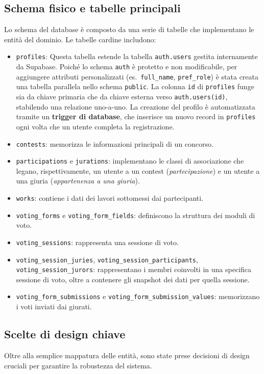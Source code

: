\subsection{Schema fisico e tabelle principali}\label{subsec:schema-fisico-e-tabelle-principali}
Lo schema del database è composto da una serie di tabelle che implementano le entità del dominio.
Le tabelle cardine includono:
\begin{itemize}
    \item \texttt{profiles}: Questa tabella estende la tabella \texttt{auth.users} gestita internamente da Supabase.
    Poiché lo schema \texttt{auth} è protetto e non modificabile, per aggiungere attributi personalizzati (es.\ \texttt{full\_name}, \texttt{pref\_role}) è stata creata una tabella parallela nello schema \texttt{public}.
    La colonna \texttt{id} di \texttt{profiles} funge sia da chiave primaria che da chiave esterna verso \texttt{auth.users(id)}, stabilendo una relazione uno-a-uno.
    La creazione del profilo è automatizzata tramite un \textbf{trigger di database}, che inserisce un nuovo record in \texttt{profiles} ogni volta che un utente completa la registrazione.
    \item \texttt{contests}: memorizza le informazioni principali di un concorso.
    \item \texttt{participations} e \texttt{jurations}: implementano le classi di associazione che legano, rispettivamente, un utente a un contest (\emph{partecipazione}) e un utente a una giuria (\emph{appartenenza a una giuria}).
    \item \texttt{works}: contiene i dati dei lavori sottomessi dai partecipanti.
    \item \texttt{voting\_forms} e \texttt{voting\_form\_fields}: definiscono la struttura dei moduli di voto.
    \item \texttt{voting\_sessions}: rappresenta una sessione di voto.
    \item \texttt{voting\_session\_juries}, \texttt{voting\_session\_participants}, \texttt{voting\_session\_jurors}: rappresentano i membri coinvolti in una specifica sessione di voto, oltre a contenere gli snapshot dei dati per quella sessione.
    \item \texttt{voting\_form\_submissions} e \texttt{voting\_form\_submission\_values}: memorizzano i voti inviati dai giurati.
\end{itemize}

\subsection{Scelte di design chiave}\label{subsec:scelte-di-design-chiave}
Oltre alla semplice mappatura delle entità, sono state prese decisioni di design cruciali per garantire la robustezza del sistema.

